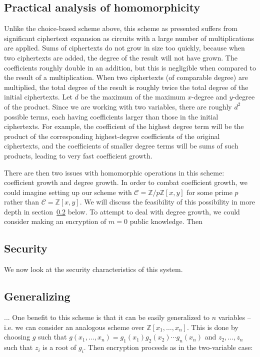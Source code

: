 \documentclass[11pt]{report}
\newcommand{\Zxn}{\mathbb{Z}[x_1,\ldots,x_n]}
\newcommand{\Zxy}{\mathbb{Z}[x,y]}
\newcommand{\Zpxy}{\mathbb{Z}/p\mathbb{Z}[x,y]}
\begin{document}
\subsection{Practical analysis of homomorphicity}
\label{sec:mv_hom_analysis}
Unlike the choice-based scheme above, this scheme as presented suffers from significant ciphertext expansion as circuits with a large number of multiplications are applied. Sums of ciphertexts do not grow in size too quickly, because when two ciphertexts are added, the degree of the result will not have grown. The coefficients roughly double in an addition, but this is negligible when compared to the result of a multiplication. When two ciphertexts (of comparable degree) are multiplied, the total degree of the result is roughly twice the total degree of the initial ciphertexts. Let $d$ be the maximum of the maximum $x$-degree and $y$-degree of the product. Since we are working with two variables, there are roughly $d^2$ possible terms, each having coefficients larger than those in the initial ciphertexts. For example, the coefficient of the highest degree term will be the product of the corresponding highest-degree coefficients of the original ciphertexts, and the coefficients of smaller degree terms will be sums of such products, leading to very fast coefficient growth.

There are then two issues with homomorphic operations in this scheme: coefficient growth and degree growth. In order to combat coefficient growth, we could imagine setting up our scheme with $\mathcal{C} = \Zpxy$ for some prime $p$ rather than $\mathcal{C} = \Zxy$. We will discuss the feasibility of this possibility in more depth in section~\ref{sec:mv_security} below. To attempt to deal with degree growth, we could consider making an encryption of $m=0$ public knowledge. Then 


\subsection{Security}
\label{sec:mv_security}
We now look at the security characteristics of this system. 


\subsection{Generalizing}

... One benefit to this scheme is that it can be easily generalized to $n$ variables -- i.e. we can consider an analogous scheme over $\Zxn$. This is done by choosing $g$ such that $g(x_1,\ldots,x_n) = g_1(x_1)g_2(x_2)\cdots g_n(x_n)$ and $z_2,\ldots,z_n$ such that $z_i$ is a root of $g_i$. Then encryption proceeds as in the two-variable case:
\end{document}
